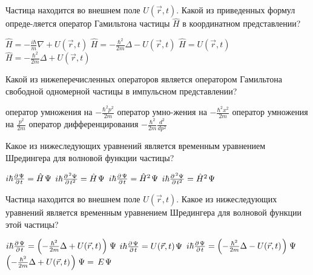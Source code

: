 \documentclass[11pt,a4paper]{exam}
\begin{document}
\begin{questions}

\question Частица находится во внешнем поле $U(\vec r,t)$. Какой из приведенных формул опреде-ляется оператор Гамильтона частицы $\hat H$ в координатном представлении?
\begin{choices}
\choice $\hat H =  - \frac{{i\hbar }}{m}\nabla  + U(\vec r,t)$    
\choice $\hat H =  - \frac{{{\hbar ^2}}}{{2m}}\Delta  - U(\vec r,t)$
\choice $\hat H = U(\vec r,t)$         
\choice $\hat H =  - \frac{{{\hbar ^2}}}{{2m}}\Delta  + U(\vec r,t)$
\end{choices}

\question Какой из нижеперечисленных операторов является оператором Гамильтона свободной одномерной частицы в импульсном представлении?
\begin{choices}
\choice оператор умножения на $ - \frac{{{\hbar ^2}{p^2}}}{{2m}}$    
\choice оператор умно-жения на $ - \frac{{{\hbar ^2}{x^2}}}{{2m}}$
\choice оператор умножения на $\frac{{{p^2}}}{{2m}}$     
\choice оператор дифференцирования $ - \frac{{{\hbar ^2}}}{{2m}}\frac{{{d^2}}}{{d{p^2}}}$ 
\end{choices}

\question Какое из нижеследующих уравнений является временным уравнением Шредингера для волновой функции частицы?
\begin{choices}
\choice $i\hbar \frac{{\partial {\kern 1pt} \Psi }}{{\partial {\kern 1pt} t}} = \hat H{\kern 1pt} \Psi $ 
\choice $i\hbar \frac{{\partial {{\kern 1pt} ^2}\Psi }}{{\partial {\kern 1pt} {t^2}}} = \hat H{\kern 1pt} \Psi $  
\choice $i\hbar \frac{{\partial {\kern 1pt} \Psi }}{{\partial {\kern 1pt} t}} = {\hat H^2}{\kern 1pt} \Psi $   
\choice $i\hbar \frac{{\partial {{\kern 1pt} ^2}\Psi }}{{\partial {\kern 1pt} {t^2}}} = {\hat H^2}{\kern 1pt} \Psi $
\end{choices}

\question Частица находится во внешнем поле $U(\vec r,t)$. Какое из нижеследующих уравнений является временным уравнением Шредингера для волновой функции этой частицы?
\begin{choices}
\choice $i\hbar \frac{{\partial {\kern 1pt} \Psi }}{{\partial {\kern 1pt} t}} = \left( { - \frac{{{\hbar ^2}}}{{2m}}\Delta  + U(\vec r,t){\kern 1pt} } \right){\kern 1pt} \Psi $       
\choice $i\hbar \frac{{\partial {\kern 1pt} \Psi }}{{\partial {\kern 1pt} t}} = U(\vec r,t){\kern 1pt} \Psi $
\choice $i\hbar \frac{{\partial {\kern 1pt} \Psi }}{{\partial {\kern 1pt} t}} = \left( { - \frac{{{\hbar ^2}}}{{2m}}\Delta  - U(\vec r,t){\kern 1pt} } \right){\kern 1pt} \Psi $       
\choice $\left( { - \frac{{{\hbar ^2}}}{{2m}}\Delta  + U(\vec r,t){\kern 1pt} } \right){\kern 1pt} \Psi  = \,E{\kern 1pt} \Psi $
\end{choices}


\end{questions}
\end{document}
